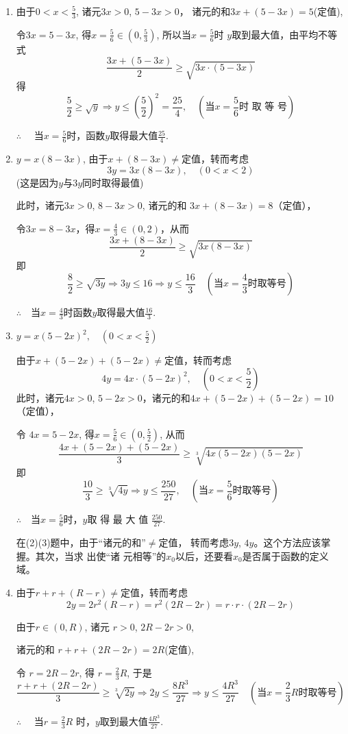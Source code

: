 \begin{solution}
\begin{enumerate}[(1)]
    \item 由于$0<x<\frac{5}{3}$,
诸元$3x>0$, $5-3x>0$，
诸元的和$3x+(5-3x)=5$(定值),

令$3x= 5- 3x$, 得$x=\frac56\in\left(0,\frac53\right)$, 所以当$x=\frac{5}{6}$时
$y$取到最大值，由平均不等式
$$\frac{3x+(5-3x)}{2}\geqslant\sqrt{3x\cdot(5-3x)}$$
得 
$$\frac 52\geqslant \sqrt {y}\Longrightarrow y\leqslant \left ( \frac 52\right ) ^2= \frac {25}{4},\quad \left ( \text{当$x= \frac 56$时 取 等 号}\right )$$

$\therefore\quad $ 当$x=\frac56$时，函数$y$取得最大值$\frac{25}{4}$.

\item $y=x(8-3x)$, 由于$x+(8-3x)\neq$定值，转而考虑
$$3y=3x(8-3x),\quad (0<x<2)$$
(这是因为$y$与$3y$同时取得最值) 

此时，诸元$3x>0$, $8-3x>0$,  诸元的和
$3x+(8-3x)=8$（定值），

令$3x=8-3x$，得$x=\frac{4}{3}\in(0,2)$，从而
\[\frac{3x+(8-3x)}{2}\ge \sqrt{3x(8-3x)}\]
即
\[\frac{8}{2}\ge \sqrt{3y}\Longrightarrow 3y\le 16\Longrightarrow y\le \frac{16}{3}\quad \left(\text{当$x=\frac{4}{3}$时取等号}\right)\]

$\therefore\quad $当$x=\frac{4}{3}$时函数$y$取得最大值$\frac{16}{3}$.

\item $y=x(5-2x)^2,\quad \left(0<x<\frac{5}{2}\right)$

由于$x+(5-2x)+(5-2x)\ne$定值，转而考虑
\[4y=4x\cdot (5-2x)^2,\quad \left(0<x<\frac{5}{2}\right)\]
此时，诸元$4x>0$, $5-2x>0$，诸元的和$4x+(5-2x)+(5-2x)=10$（定值），

令 $4x= 5- 2x$, 得$x=\frac56\in\left(0,\frac52\right)$, 从而
$$\frac {4x+( 5- 2x) + ( 5- 2x) }{3}\geqslant \sqrt [ 3] {4x( 5- 2x) ( 5- 2x) }$$
即
$$\frac {10}{3}\geqslant \sqrt [3] {4y}\Longrightarrow {y}\leqslant \frac {250}{27},\quad \left (\text{当$x=\frac{5}{6}$时取等号}\right)$$

$\therefore\quad $当$x=\frac{5}{6}$时，$y$取 得 最 大 值 $\frac {250}{27}$.

\begin{rmk}
    在(2)(3)题中，由于“诸元的和”$\neq$定值，
转而考虑$3y$, $4y$。这个方法应该掌握。其次，当求 出使“诸
元相等”的$x_0$以后，还要看$x_0$是否属于函数的定义域。
\end{rmk}

\item 由于$r+r+(R-r)\neq$定值，转而考虑
$$2y=2r^{2}(R-r)=r^{2}(2R-2r)=r\cdot r\cdot(2R-2r)$$

由于$r\in(0,R)$, 诸元 $r> 0$, $2R- 2r> 0$, 

诸元的和
$r+r+(2R-2r)=2R$(定值), 

令 $r= 2R- 2r$, 得 $r= \frac{2}{3}R$, 于是
$$\frac{r+r+(2R-2r)}{3}\geqslant\sqrt[3]{2y}\Longrightarrow 2y\leqslant\frac{8R^3}{27}\Longrightarrow y\leqslant\frac{4R^3}{27}\quad \left(\text{当}x=\frac{2}{3}R\text{时取等号}\right)$$

$\therefore\quad$ 当$r= \frac{2}{3}R$ 时，$y$取到最大值$\frac{4R^{3}}{27}$.
\end{enumerate}
\end{solution}

